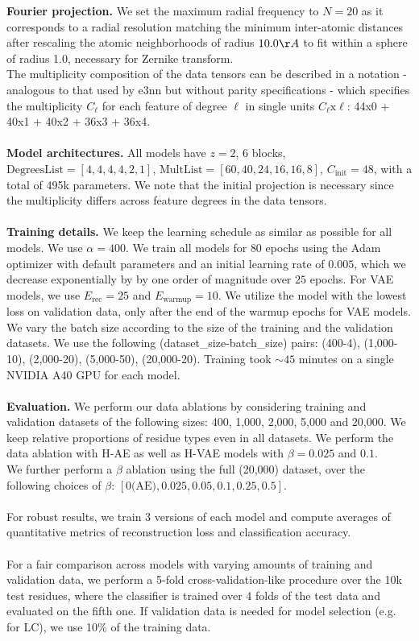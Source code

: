 \noindent \textbf{Fourier projection.} We set the maximum radial frequency to $N = 20$ as  it
corresponds to a radial resolution matching the minimum inter-atomic distances after rescaling the
atomic neighborhoods of radius  $10.0\AA$ to fit within a sphere of radius 1.0, necessary for
Zernike transform.\\
The multiplicity composition of the data tensors can be described  in a notation - analogous to
that used by e3nn but without parity specifications - which specifies the multiplicity $C_{\ell}$
for each feature of degree $\ell$ in single units $C_{\ell}\text{x}\ell$: 44x0 + 40x1 + 40x2 + 36x3
+ 36x4.\\
\\
\textbf{Model architectures.} All models have $z = 2$, 6 blocks, $\text{DegreesList} = [4, 4, 4, 4,
2, 1]$, $\text{MultList} = [60, 40, 24, 16, 16, 8]$, $C_\text{init} = 48$, with a total of 495k
parameters. We note that the initial projection is necessary since the multiplicity differs across
feature degrees in the data tensors.\\
\\
\textbf{Training details.} We keep the learning schedule as similar as possible for all models. We
use $\alpha = 400$. We train all models for $80$ epochs using the Adam optimizer with default
parameters and an initial learning rate of $0.005$, which we decrease exponentially by by one order
of magnitude over $25$ epochs. For VAE models, we use $E_\text{rec} = 25$ and $E_\text{warmup} =
10$. We utilize the model with the lowest loss on validation data, only after the end of the warmup
epochs for VAE models.\\
We vary the batch size according to the size of the training and the validation datasets. We use
the following (dataset\_size-batch\_size) pairs: (400-4), (1,000-10), (2,000-20), (5,000-50),
(20,000-20). Training took $\sim 45$ minutes on a single NVIDIA A40 GPU for each model.\\
\\
\textbf{Evaluation.} We perform our data ablations by considering training and validation datasets
of the following sizes: 400, 1,000, 2,000, 5,000 and 20,000. We keep relative proportions of
residue types even in all datasets. We perform the data ablation with H-AE as well as H-VAE models
with $\beta = 0.025$ and $0.1$.\\
We further perform a $\beta$ ablation using the full (20,000) dataset, over the following choices
of $\beta$: $[0 \text{(AE)}, 0.025, 0.05, 0.1, 0.25, 0.5]$.\\
\\
For robust results, we train 3 versions of each model and compute averages of quantitative metrics
of reconstruction loss and classification accuracy.\\
\\
For a fair comparison across models with varying amounts of training and validation data, we
perform a 5-fold cross-validation-like procedure over the 10k test residues, where the classifier
is trained over 4 folds of the test data and evaluated on the fifth one. If validation data is
needed for model selection (e.g. for LC), we use 10\% of the training data.

